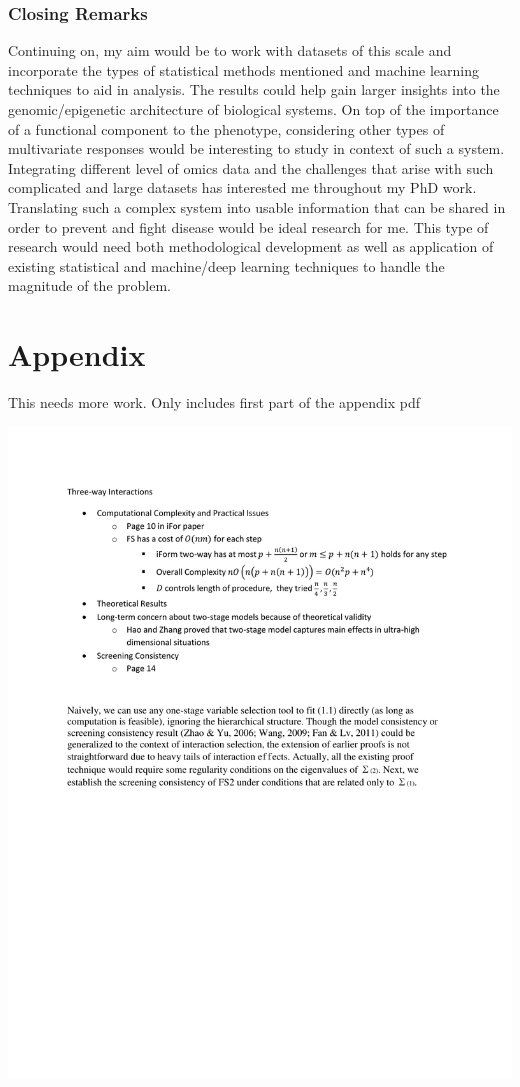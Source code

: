 \documentclass[11pt,]{book}
\theoremstyle{definition}
\theoremstyle{definition}
\theoremstyle{remark}
\begin{document}
\subsection{Closing Remarks}\label{closing-remarks}

Continuing on, my aim would be to work with datasets of this scale and
incorporate the types of statistical methods mentioned and machine
learning techniques to aid in analysis. The results could help gain
larger insights into the genomic/epigenetic architecture of biological
systems. On top of the importance of a functional component to the
phenotype, considering other types of multivariate responses would be
interesting to study in context of such a system. Integrating different
level of omics data and the challenges that arise with such complicated
and large datasets has interested me throughout my PhD work. Translating
such a complex system into usable information that can be shared in
order to prevent and fight disease would be ideal research for me. This
type of research would need both methodological development as well as
application of existing statistical and machine/deep learning techniques
to handle the magnitude of the problem.

\chapter{Appendix}\label{appendix}

This needs more work. Only includes first part of the appendix pdf

\begin{center} 
\includegraphics[width=8in]{appendix.pdf} 
\end{center}


\end{document}
